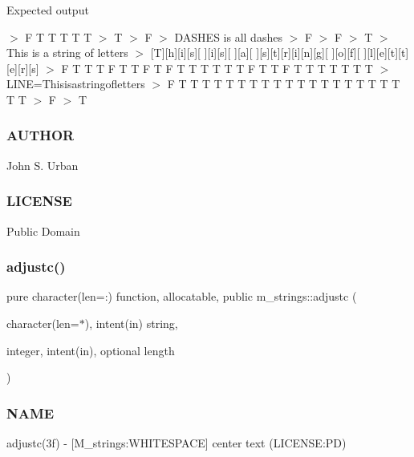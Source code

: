 Expected output

$>$ F T T T T T $>$ T $>$ F $>$ D\+A\+S\+H\+ES is all dashes $>$ F $>$ F $>$ T $>$ This is a string of letters $>$ \mbox{[}T\mbox{]}\mbox{[}h\mbox{]}\mbox{[}i\mbox{]}\mbox{[}s\mbox{]}\mbox{[} \mbox{]}\mbox{[}i\mbox{]}\mbox{[}s\mbox{]}\mbox{[} \mbox{]}\mbox{[}a\mbox{]}\mbox{[} \mbox{]}\mbox{[}s\mbox{]}\mbox{[}t\mbox{]}\mbox{[}r\mbox{]}\mbox{[}i\mbox{]}\mbox{[}n\mbox{]}\mbox{[}g\mbox{]}\mbox{[} \mbox{]}\mbox{[}o\mbox{]}\mbox{[}f\mbox{]}\mbox{[} \mbox{]}\mbox{[}l\mbox{]}\mbox{[}e\mbox{]}\mbox{[}t\mbox{]}\mbox{[}t\mbox{]}\mbox{[}e\mbox{]}\mbox{[}r\mbox{]}\mbox{[}s\mbox{]} $>$ F T T T F T T F T F T T T T T T F T T F T T T T T T T $>$ L\+I\+NE=Thisisastringofletters $>$ F T T T T T T T T T T T T T T T T T T T T T $>$ F $>$ T \subsubsection*{A\+U\+T\+H\+OR}

John S. Urban \subsubsection*{L\+I\+C\+E\+N\+SE}

Public Domain \mbox{\label{namespacem__strings_a1cacb2e45c7e3d7ed4cc1b183c35f323}} 
\subsubsection{\texorpdfstring{adjustc()}{adjustc()}}
{\footnotesize\ttfamily pure character(len=\+:) function, allocatable, public m\+\_\+strings\+::adjustc (\begin{DoxyParamCaption}\item[{character(len=$\ast$), intent(in)}]{string,  }\item[{integer, intent(in), optional}]{length }\end{DoxyParamCaption})}



\subsubsection*{N\+A\+ME}

adjustc(3f) -\/ \mbox{[}M\+\_\+strings\+:W\+H\+I\+T\+E\+S\+P\+A\+CE\mbox{]} center text (L\+I\+C\+E\+N\+SE\+:PD) 

